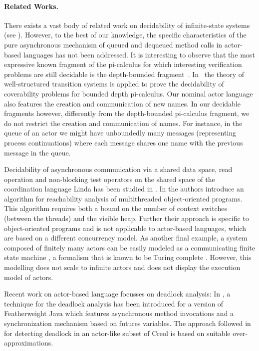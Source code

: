\documentclass{LMCS}
\theoremstyle{plain}\newtheorem{proposition}[thm]{Proposition}
\theoremstyle{plain}\newtheorem{lemma}[thm]{Lemma}
\theoremstyle{plain}\newtheorem{theorem}[thm]{Theorem}
\theoremstyle{plain}\newtheorem{corollary}[thm]{Corollary}
\newif\ifcamera \camerafalse
\begin{document}
\paragraph{\bf Related Works.}
There exists a vast body of  related work on decidability of infinite-state systems 
(see  \cite{abdulla:96}).
However, to the best of our knowledge, the specific characteristics of 
the pure  asynchronous mechanism of queued and dequeued method calls in actor-based languages
has not been addressed.
It is interesting to observe that the most expressive known fragment of the  pi-calculus for which interesting verification problems are still decidable is the depth-bounded 
fragment~\cite{meyer08}. 
In~\cite{wies10} the theory of well-structured transition
systems is applied to prove the decidability of coverability problems for bounded depth pi-calculus.
Our nominal actor language also features the creation and communication of  new names. In our decidable fragments however, differently from the
depth-bounded pi-calculus fragment, 
we do not restrict the creation and communication of names. For instance, in the queue of an actor we might have 
unboundedly many messages (representing process continuations) where each message shares one name with the previous message in the queue.
\ifcamera
\else
Decidability of asynchronous communication via a shared data space, 
read operation and non-blocking test operators on the shared space
of the coordination language Linda has been studied in \cite{Busi20009}.
In \cite{BouajjaniFQ07} the authors introduce an algorithm for reachability analysis of multithreaded object-oriented programs.
This algorithm requires both a bound on the number of context switches (between the threads) and the visible heap.
Further their approach is specific to object-oriented programs and is not applicable to  actor-based languages,
which are based on a different concurrency model.
As another final example, a system composed of finitely many actors  can be easily modeled
as a communicating finite state machine \cite{Brand83}, a formalism that is 
known to be Turing complete \cite{Brand83,Memmi85}.
However, this modelling does not scale to infinite actors and does not
display the execution model of actors.
\fi
Recent work on  actor-based language focusses on deadlock analysis:
In \cite{GiachinoL11}, a technique for the deadlock analysis has been introduced for a version of Featherweight Java
which features asynchronous method invocations and a synchronization mechanism based on futures variables.
The approach followed in \cite{deBoer2012} 
for detecting deadlock in an actor-like subset of Creol \cite{Johnsen07} is based on suitable over-approximations.
\end{document}
